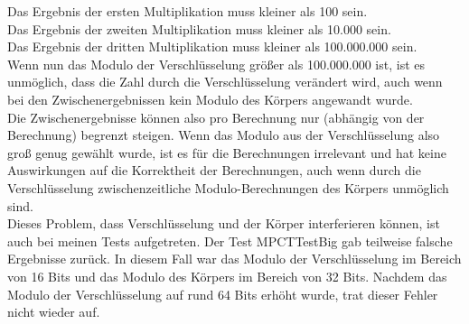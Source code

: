 Das Ergebnis der ersten Multiplikation muss kleiner als 100 sein.\\
Das Ergebnis der zweiten Multiplikation muss kleiner als 10.000 sein.\\
Das Ergebnis der dritten Multiplikation muss kleiner als 100.000.000 sein.\\
Wenn nun das Modulo der Verschlüsselung größer als 100.000.000 ist, ist es unmöglich, dass die Zahl durch die Verschlüsselung verändert wird, auch wenn bei den Zwischenergebnissen kein Modulo des Körpers angewandt wurde.\\
Die Zwischenergebnisse können also pro Berechnung nur (abhängig von der Berechnung) begrenzt steigen.
Wenn das Modulo aus der Verschlüsselung also groß genug gewählt wurde, ist es für die Berechnungen irrelevant und hat keine Auswirkungen auf die Korrektheit der Berechnungen, auch wenn durch die Verschlüsselung zwischenzeitliche Modulo-Berechnungen des Körpers unmöglich sind.\\
Dieses Problem, dass Verschlüsselung und der Körper interferieren können, ist auch bei meinen Tests aufgetreten. Der Test MPCTTestBig gab teilweise falsche Ergebnisse zurück. In diesem Fall war das Modulo der Verschlüsselung im Bereich von 16 Bits und das Modulo des Körpers im Bereich von 32 Bits. Nachdem das Modulo der Verschlüsselung auf rund 64 Bits erhöht wurde, trat dieser Fehler nicht wieder auf.\\